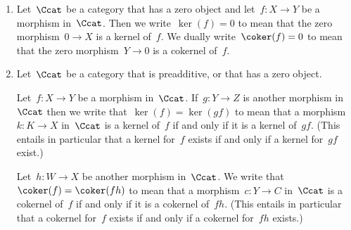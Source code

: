 









\begin{notation*}
  \label{equality of (co)kernels}
  \leavevmode
  \begin{enumerate}
    \item
      Let~$\Ccat$ be a category that has a zero object and let~$f \colon X \to Y$ be a morphism in~$\Ccat$.
      Then we write~$\ker(f) = 0$ to mean that the zero morphism~$0 \to X$ is a kernel of~$f$.
      We dually write~$\coker(f) = 0$ to mean that the zero morphism~$Y \to 0$ is a cokernel of~$f$.
    \item
      Let~$\Ccat$ be a category that is preadditive, or that has a zero object.
      
      Let~$f \colon X \to Y$ be a morphism in~$\Ccat$.
      If~$g \colon Y \to Z$ is another morphism in~$\Ccat$ then we write that~$\ker(f) = \ker(gf)$ to mean that a morphism~$k \colon K \to X$ in~$\Ccat$ is a kernel of~$f$ if and only if it is a kernel of~$gf$.
      (This entails in particular that a kernel for~$f$ exists if and only if a kernel for~$gf$ exist.)
      
      Let~$h \colon W \to X$ be another morphism in~$\Ccat$.
      We write that~$\coker(f) = \coker(fh)$ to mean that a morphism~$c \colon Y \to C$ in~$\Ccat$ is a cokernel of~$f$ if and only if it is a cokernel of~$fh$.
      (This entails in particular that a cokernel for~$f$ exists if and only if a cokernel for~$fh$ exists.)
  \end{enumerate}
\end{notation*}


